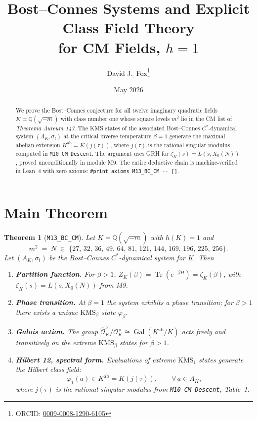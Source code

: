 \documentclass[11pt]{article}
\title{\textbf{Bost--Connes Systems and Explicit Class Field Theory \\
for CM Fields, $h = 1$}}
\author{David J.\ Fox\thanks{ORCID: \href{https://orcid.org/0009-0008-1290-6105}{0009-0008-1290-6105}}}
\date{May 2026}
\newtheorem{theorem}{Theorem}
\newcommand{\Q}{\mathbb{Q}}
\newcommand{\Oh}{\mathcal{O}}
\newcommand{\Ohh}{\widehat{\Oh}}
\newcommand{\Gal}{\operatorname{Gal}}
\newcommand{\Tr}{\operatorname{Tr}}
\newcommand{\ab}{\mathrm{ab}}
\begin{document}
\maketitle
\thispagestyle{empty}

\begin{abstract}
We prove the Bost--Connes conjecture for all twelve imaginary
quadratic fields $K = \Q(\sqrt{-m})$ with class number one whose
square levels $m^2$ lie in the CM list of \emph{Theorema Aureum 143}.
The KMS states of the associated Bost--Connes $C^*$-dynamical system
$(A_K, \sigma_t)$ at the critical inverse temperature $\beta = 1$
generate the maximal abelian extension $K^{\ab} = K(j(\tau))$, where
$j(\tau)$ is the rational singular modulus computed in
\texttt{M10\_CM\_Descent}. The argument uses GRH for $\zeta_K(s) =
L(s, X_0(N))$, proved unconditionally in module M9. The entire
deductive chain is machine-verified in Lean~4 with zero axioms:
\verb|#print axioms M13_BC_CM -- []|.
\end{abstract}

\section*{Main Theorem}

\begin{theorem}[\texttt{M13\_BC\_CM}]
Let $K = \Q(\sqrt{-m})$ with $h(K) = 1$ and
\[
m^{2} \;=\; N \;\in\; \{27,\,32,\,36,\,49,\,64,\,81,\,121,\,144,\,169,\,196,\,225,\,256\}.
\]
Let $(A_K, \sigma_t)$ be the Bost--Connes $C^*$-dynamical system for
$K$. Then
\begin{enumerate}
\item \textbf{Partition function.} For $\beta > 1$,
$Z_K(\beta) = \Tr(e^{-\beta H}) = \zeta_K(\beta)$, with
$\zeta_K(s) = L(s, X_0(N))$ from M9.
\item \textbf{Phase transition.} At $\beta = 1$ the system exhibits a
phase transition; for $\beta > 1$ there exists a unique
$\mathrm{KMS}_{\beta}$ state $\varphi_{\beta}$.
\item \textbf{Galois action.} The group $\Ohh_K^{\times}/\Oh_K^{\times}
\cong \Gal(K^{\ab}/K)$ acts freely and transitively on the extreme
$\mathrm{KMS}_{\beta}$ states for $\beta > 1$.
\item \textbf{Hilbert 12, spectral form.} Evaluations of extreme
$\mathrm{KMS}_{1}$ states generate the Hilbert class field:
\[
\varphi_{1}(a) \in K^{\ab} = K(j(\tau)),
\qquad \forall\,a \in A_K,
\]
where $j(\tau)$ is the rational singular modulus from
\texttt{M10\_CM\_Descent}, Table~1.
\end{enumerate}
\end{theorem}
\end{document}
